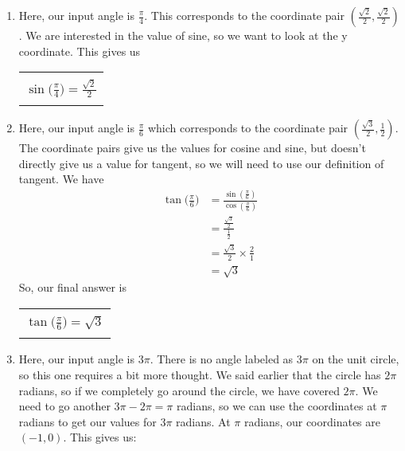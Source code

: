 {\begin{enumerate}
	\item Here, our input angle is $\frac{\pi}{4}$. This corresponds to the coordinate pair $(\frac{\sqrt{2}}{2}, \frac{\sqrt{2}}{2})$. We are interested in the value of sine, so we want to look at the y coordinate. This gives us 
			\begin{center}
		\begin{tabular}{| c |} \hline
			\\[-8pt]
			$\displaystyle \sin{\bigg(\frac{\pi}{4}\bigg)} = \frac{\sqrt{2}}{2}$ \\[-8pt]
			\\\hline
		\end{tabular}
	\end{center}
	\item Here, our input angle is $\frac{\pi}{6}$ which corresponds to the coordinate pair $(\frac{\sqrt{3}}{2}, \frac{1}{2})$. The coordinate pairs give us the values for cosine and sine, but doesn't directly give us a value for tangent, so we will need to use our definition of tangent. We have 
		\begin{equation*}
			\begin{split}
				\tan{\bigg(\frac{\pi}{6}\bigg)} &= \frac{\sin{(\frac{\pi}{6})}}{\cos{(\frac{\pi}{6})}} \\[6pt]
						      &=\frac{\frac{\sqrt{3}}{2}}{\frac{1}{2}} \\[6pt]
						      &= \frac{\sqrt{3}}{2} \times \frac{2}{1} \\[6pt]
						      & = \sqrt{3}
			\end{split}
	\end{equation*}
		So, our final answer is
			\begin{center}
		\begin{tabular}{| c |} \hline
			\\[-8pt]
			$\displaystyle \tan{\bigg(\frac{\pi}{6}\bigg)}= \sqrt{3}$ \\[-8pt]
			\\\hline
		\end{tabular}
	\end{center}
	\item Here, our input angle is $3\pi$. There is no angle labeled as $3\pi$ on the unit circle, so this one requires a bit more thought. We said earlier that the circle has $2\pi$ radians, so if we completely go around the circle, we have covered $2\pi$. We need to go another $3\pi-2\pi=\pi$ radians, so we can use the coordinates at $\pi$ radians to get our values for $3\pi$ radians. At $\pi$ radians, our coordinates are $(-1,0)$. This gives us:

\end{enumerate}}
